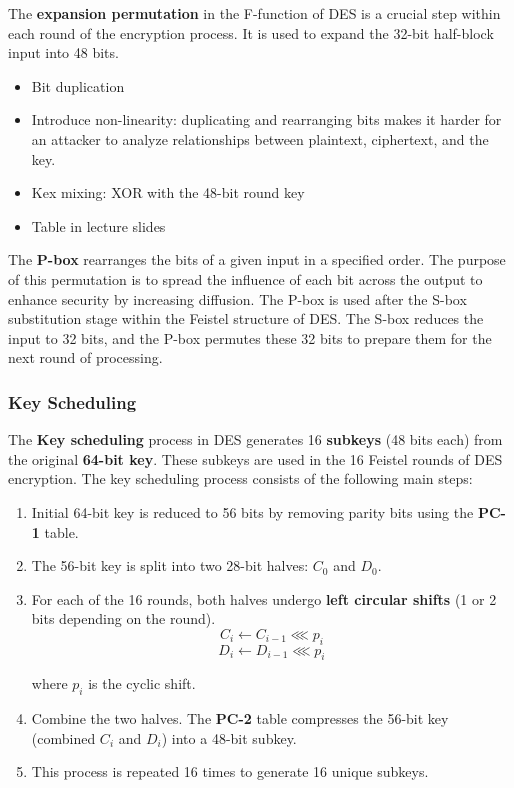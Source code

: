The \textbf{expansion permutation} in the F-function of DES is a crucial step within each round of the encryption process. It is used to expand the 32-bit half-block input into 48 bits.
\begin{itemize}
    \item Bit duplication
    \item Introduce non-linearity: duplicating and rearranging bits makes it harder for an attacker to analyze relationships between plaintext, ciphertext, and the key.
    \item Kex mixing: XOR with the 48-bit round key
    \item Table in lecture slides
\end{itemize}

The \textbf{P-box} rearranges the bits of a given input in a specified order. The purpose of this permutation is to spread the influence of each bit across the output to enhance security by increasing diffusion. The P-box is used after the S-box substitution stage within the Feistel structure of DES. The S-box reduces the input to 32 bits, and the P-box permutes these 32 bits to prepare them for the next round of processing.

\subsubsection{Key Scheduling}
The \textbf{Key scheduling} process in DES generates 16 \textbf{subkeys} (48 bits each) from the original \textbf{64-bit key}. These subkeys are used in the 16 Feistel rounds of DES encryption. The key scheduling process consists of the following main steps:
\begin{enumerate}
    \item Initial 64-bit key is reduced to 56 bits by removing parity bits using the \textbf{PC-1} table.
    \item The 56-bit key is split into two 28-bit halves: \( C_0 \) and \( D_0 \).
    \item For each of the 16 rounds, both halves undergo \textbf{left circular shifts} (1 or 2 bits depending on the round).
            \[ C_i \leftarrow C_{i-1} \lll p_i \]
            \[ D_i \leftarrow D_{i-1} \lll p_i \]

        where $p_i$ is the cyclic shift.
    \item Combine the two halves. The \textbf{PC-2} table compresses the 56-bit key (combined \( C_i \) and \( D_i \)) into a 48-bit subkey.
    \item This process is repeated 16 times to generate 16 unique subkeys.
\end{enumerate}

